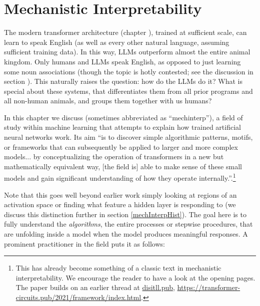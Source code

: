 \chapter{Mechanistic Interpretability}\label{ch_mechinterp}


The modern transformer architecture (chapter ), trained
at sufficient scale, can learn to speak English (as well as every other natural
language, assuming sufficient training data). In this way, LLMs outperform
almost the entire animal kingdom. Only humans and LLMs speak English, as
opposed to just learning some noun associations (though the topic is hotly
contested; see the discussion in section ). This
naturally raises the question: how do the LLMs do it? What is special about
these systems, that differentiates them from all prior programs and all
non-human animals, and groups them together with us humans?

In this chapter we discuss  (sometimes
abbreviated as ``mechinterp''), a field of study within machine learning that
attempts to explain how trained artificial neural networks work. Its aim ``is
to discover simple algorithmic patterns, motifs, or frameworks that can
subsequently be applied to larger and more complex models... by conceptualizing
the operation of transformers in a new but mathematically equivalent way, [the
field is] able to make sense of these small models and gain significant
understanding of how they operate
internally.''\cite{elhage2021mathematical}.\footnote{This has already become
something of a classic text in mechanistic interpretability. We encourage the
reader to have a look at the opening pages. The paper builds on an earlier
thread at \url{disitll.pub},
\url{https://transformer-circuits.pub/2021/framework/index.html}.} 

Note that this goes well beyond earlier work simply looking at regions of an
activation space or finding what feature a hidden layer is responding to (we
discuss this distinction further in section \ref{mechInterpHist}). The goal
here is to fully understand the \emph{algorithms}, the entire processes or
stepwise procedures, that are unfolding inside a model when the model produces
meaningful responses. A prominent practitioner in the field puts it as follows:

